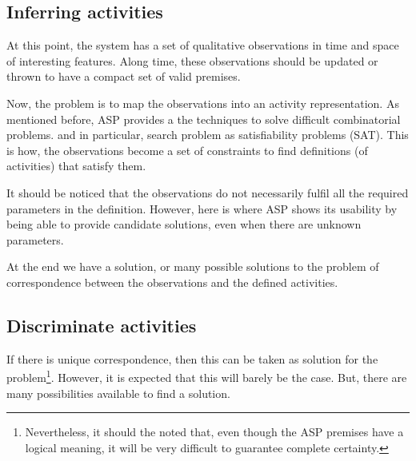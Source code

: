 


\subsection{Inferring activities}

At this point, the system has a set of qualitative observations in time and space of interesting features.
Along time, these observations should be updated or thrown to have a compact set of valid premises.

Now, the problem is to map the observations into an activity representation. 
As mentioned before, ASP provides a the techniques to solve difficult combinatorial problems. and in particular, search problem as satisfiability problems (SAT).
This is how, the observations become a set of constraints to find definitions (of activities) that satisfy them.

It should be noticed that the observations do not necessarily fulfil all the required parameters in the definition.
However, here is where ASP shows its usability by being able to provide candidate solutions, even when there are unknown parameters.

At the end we have a solution, or many possible solutions to the problem of correspondence between the observations and the defined activities.



\subsection{Discriminate activities}

If there is unique correspondence, then this can be taken as solution for the problem\footnote{Nevertheless, it should the noted that, even though the ASP premises have a logical meaning, it will be very difficult to guarantee complete certainty.}. 
However, it is expected that this will barely be the case.
But, there are many possibilities available to find a solution.

